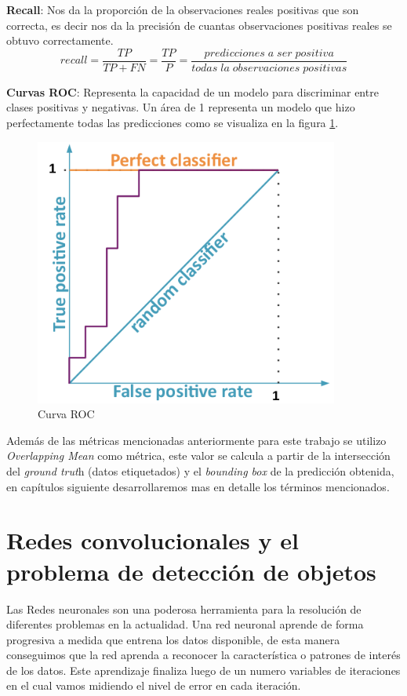 \textbf{Recall}: Nos da la proporción de la observaciones reales positivas que son correcta, es decir nos da la precisión de cuantas observaciones positivas reales se obtuvo correctamente.
\begin{equation}
recall = \frac{TP}{TP+FN} = \frac{TP}{P} = \frac{predicciones\;a\;ser\;positiva}{todas\;la\;observaciones\;positivas} 
\end{equation}

\textbf{Curvas ROC}: Representa la capacidad de un modelo para discriminar entre clases positivas y negativas. Un área de 1 representa un modelo que hizo perfectamente todas las predicciones como se visualiza en la figura \ref{Fig: roc}.
\begin{figure}[H]
 \centering
  \includegraphics[scale=0.5,keepaspectratio=true,clip=true]{imagenes/MarcoTeorico/curvas-roc.png}
  \caption{Curva ROC} \label{Fig: roc}
\end{figure}

Además de las métricas mencionadas anteriormente para este trabajo se utilizo \textit{Overlapping Mean} como métrica, este valor se calcula a partir de la intersección del \textit{ground trut}h (datos etiquetados) y el\textit{ bounding box} de la predicción obtenida, en capítulos siguiente desarrollaremos mas en detalle los términos mencionados.


\section{Redes convolucionales y el problema de detección de objetos}\label{sec:compueter-vision}

Las Redes neuronales son una poderosa herramienta para la resolución de diferentes problemas en la actualidad. Una red neuronal aprende de forma progresiva a medida que entrena los datos disponible, de esta manera conseguimos que la red aprenda a reconocer la característica o patrones de interés de los datos. Este aprendizaje finaliza luego de un numero variables de iteraciones en el cual vamos midiendo el nivel de error en cada iteración.

